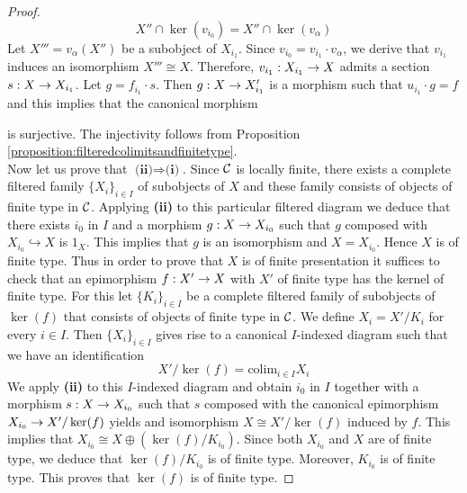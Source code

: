 \begin{proof}
$$X''\cap \ker(v_{i_0}) = X''\cap \ker(v_{\alpha})$$
Let $X''' = v_{\alpha}(X'')$ be a subobject of $X_{i_1}$. Since $v_{i_0} = v_{i_1}\cdot v_{\alpha}$, we derive that $v_{i_1}$ induces an isomorphism $X'''\cong X$. Therefore, $v_{i_1}:X_{i_1}\rightarrow X$ admits a section $s:X\rightarrow X_{i_1}$. Let $g = f_{i_1}\cdot s$. Then $g:X\rightarrow X'_{i_1}$ is a morphism such that $u_{i_1}\cdot g = f$ and this implies that the canonical morphism
\begin{center}
\end{center}
is surjective. The injectivity follows from Proposition \ref{proposition:filteredcolimitsandfinitetype}.\\
Now let us prove that $\textbf{(ii)}\Rightarrow \textbf{(i)}$. Since ${\mathcal C}$ is locally finite, there exists a complete filtered family $\{X_i\}_{i\in I}$ of subobjects of $X$ and these family consists of objects of finite type in ${\mathcal C}$. Applying \textbf{(ii)} to this particular filtered diagram we deduce that there exists $i_0$ in $I$ and a morphism $g:X\rightarrow X_{i_0}$ such that $g$ composed with $X_{i_0}\hookrightarrow X$ is $1_X$. This implies that $g$ is an isomorphism and $X = X_{i_0}$. Hence $X$ is of finite type. Thus in order to prove that $X$ is of finite presentation it suffices to check that an epimorphism $f:X'\rightarrow X$ with $X'$ of finite type has the kernel of finite type. For this let $\{K_i\}_{i\in I}$ be a complete filtered family of subobjects of $\ker(f)$ that consists of objects of finite type in ${\mathcal C}$. We define $X_i = X'/K_i$ for every $i\in I$. Then $\{X_i\}_{i\in I}$ gives rise to a canonical $I$-indexed diagram such that we have an identification
$$X'/\ker(f) = \mathrm{colim}_{i\in I}X_i$$
We apply \textbf{(ii)} to this $I$-indexed diagram and obtain $i_0$ in $I$ together with a morphism $s:X\rightarrow X_{i_0}$ such that $s$ composed with the canonical epimorphism $X_{i_0}\rightarrow X'/\ker(f)$ yields and isomorphism $X \cong X'/\ker(f)$ induced by $f$. This implies that $X_{i_0} \cong X \oplus \left(\ker(f)/K_{i_0}\right)$. Since both $X_{i_0}$ and $X$ are of finite type, we deduce that $\ker(f)/K_{i_0}$ is of finite type. Moreover, $K_{i_0}$ is of finite type. This proves that $\ker(f)$ is of finite type.
\end{proof}

